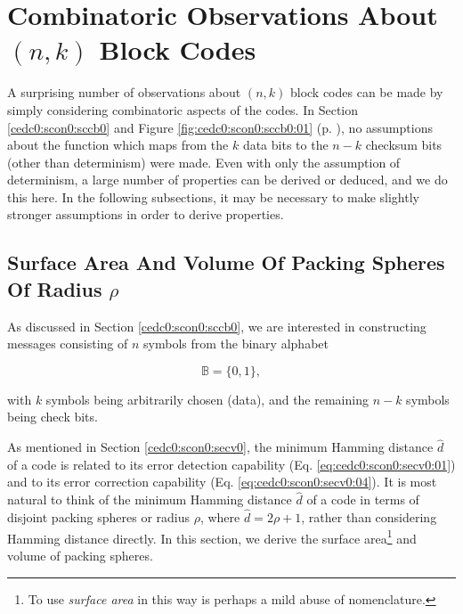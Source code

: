 \section[Combinatoric Observations]
        {Combinatoric Observations About \protect\mbox{\protect\boldmath$(n,k)$} Block Codes}
\label{cedc0:scob0}

A surprising number of observations about $(n,k)$ block codes can be made by
simply considering combinatoric aspects of the codes.  In Section 
\ref{cedc0:scon0:sccb0} and Figure \ref{fig:cedc0:scon0:sccb0:01} 
(p. \pageref{fig:cedc0:scon0:sccb0:01}), no assumptions about the function which
maps from the $k$ data bits to the $n-k$ checksum bits (other than determinism)
were made.  Even with only the assumption of determinism, a large number of properties
can be derived or deduced, and we do this here.  In the following 
subsections, it may be necessary to make slightly stronger assumptions in order
to derive properties.


\subsection[Packing Spheres Of Radius \protect\mbox{\protect$\rho$}]
        {Surface Area And Volume Of Packing Spheres Of Radius \protect\mbox{\protect\boldmath$\rho$}}
\label{cedc0:scob0:psr0}

As discussed in Section \ref{cedc0:scon0:sccb0}, we are interested in constructing
messages consisting of $n$ symbols from the binary alphabet

\begin{equation}
\label{eq:cedc0:scob0:psr0:01}
\mathbb{B} = \{ 0, 1 \} ,
\end{equation}

\noindent{}with $k$ symbols being arbitrarily chosen (data), and the remaining
$n-k$ symbols being check bits.

As mentioned in Section \ref{cedc0:scon0:secv0}, the minimum Hamming distance 
$\hat{d}$
of a
code is related to its error detection capability (Eq. \ref{eq:cedc0:scon0:secv0:01})
and to its error correction capability (Eq. \ref{eq:cedc0:scon0:secv0:04}).
It is most natural to think of the minimum Hamming distance $\hat{d}$ of a code
in terms of disjoint packing spheres or radius $\rho$, where $\hat{d} = 2 \rho + 1$,
rather than considering Hamming distance directly.  In this section, we
derive the surface area\footnote{To use \emph{surface area} in this way is perhaps
a mild abuse of nomenclature.} and volume of packing spheres.

